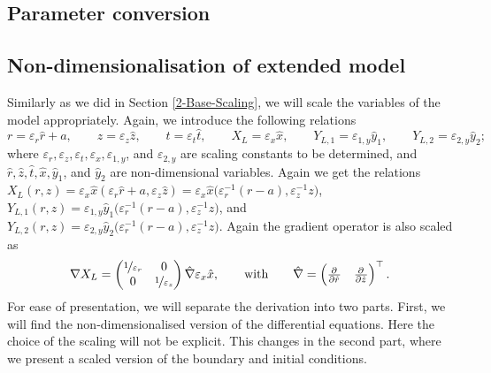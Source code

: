 \documentclass[11pt]{article}
\numberwithin{equation}{section}
\begin{document}
\subsection{Parameter conversion}
\label{app:two}



























\subsection{Non-dimensionalisation of extended model}
\label{app:non-dim}

Similarly as we did in Section \ref{2-Base-Scaling}, 
we will scale the variables of the model appropriately. Again, we introduce the following relations
\[
    r = \varepsilon_r \hat{r} + a,
    \qquad
    z = \varepsilon_z \hat{z},
    \qquad
    t = \varepsilon_t \hat{t},
    \qquad
    X_L = \varepsilon_x \hat{x},
    \qquad
    Y_{L,1} = \varepsilon_{1,y} \hat{y}_1,
    \qquad
    Y_{L,2} = \varepsilon_{2,y} \hat{y}_2;
\]
where \( \varepsilon_r, \varepsilon_z, \varepsilon_t, \varepsilon_x, \varepsilon_{1,y}\), and \(\varepsilon_{2,y}\) are scaling constants to be determined, and \(\hat{r}, \hat z, \hat t, \hat x, \hat y_1\), and \(\hat y_2\) are non-dimensional variables.
Again we get the relations \(X_L(r,z) = \varepsilon_x \hat{x} (\varepsilon_r \hat r + a, \varepsilon_z \hat z) = \varepsilon_x \hat{x} \big( \varepsilon_r^{-1} (r-a) , \varepsilon_z^{-1} z\big) \), \(Y_{L,1} (r,z) = \varepsilon_{1,y} \hat{y}_1 \big( \varepsilon_r^{-1} (r-a), \varepsilon_z^{-1} z \big)\), and \(Y_{L,2} (r,z) = \varepsilon_{2,y} \hat{y}_2 \big( \varepsilon_r^{-1} (r-a), \varepsilon_z^{-1} z \big)\). Again the gradient operator is also scaled as
\[
    \nabla X_L =
    \begin{pmatrix}
        \nicefrac{1}{\varepsilon_r} & 0 \\
        0 & \nicefrac{1}{\varepsilon_z}
    \end{pmatrix}
    \hat{\nabla} \varepsilon_x \hat{x},
    \qquad \text{with} \qquad
    \hat{\nabla} = 
    \begin{pmatrix}
        \pd{ }{\hat r}
        &
        \pd{ }{\hat z}
    \end{pmatrix}^\top .
\]
For ease of presentation, we will separate the derivation into two parts. First, we will find the non-dimensionalised version of the differential equations. Here the choice of the scaling will not be explicit. This changes in the second part, where we present a scaled version of the boundary and initial conditions.
\end{document}
